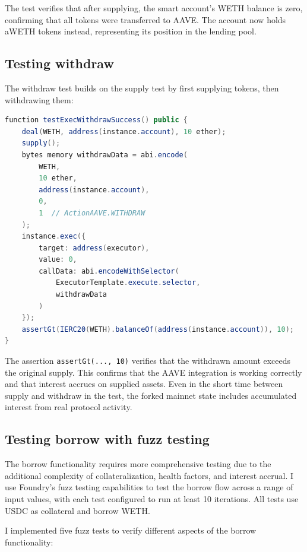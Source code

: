 The test verifies that after supplying, the smart account's WETH balance is zero, confirming that all tokens were transferred to AAVE. The account now holds aWETH tokens instead, representing its position in the lending pool.

\subsection{Testing withdraw}

The withdraw test builds on the supply test by first supplying tokens, then withdrawing them:

\begin{lstlisting}[language=Java,caption={Withdraw test},label=lst:test-withdraw]
function testExecWithdrawSuccess() public {
    deal(WETH, address(instance.account), 10 ether);
    supply();
    bytes memory withdrawData = abi.encode(
        WETH,
        10 ether,
        address(instance.account),
        0,
        1  // ActionAAVE.WITHDRAW
    );
    instance.exec({
        target: address(executor),
        value: 0,
        callData: abi.encodeWithSelector(
            ExecutorTemplate.execute.selector,
            withdrawData
        )
    });
    assertGt(IERC20(WETH).balanceOf(address(instance.account)), 10);
}
\end{lstlisting}

The assertion \texttt{assertGt(..., 10)} verifies that the withdrawn amount exceeds the original supply. This confirms that the AAVE integration is working correctly and that interest accrues on supplied assets. Even in the short time between supply and withdraw in the test, the forked mainnet state includes accumulated interest from real protocol activity.

\subsection{Testing borrow with fuzz testing}

The borrow functionality requires more comprehensive testing due to the additional complexity of collateralization, health factors, and interest accrual. I use Foundry's fuzz testing capabilities to test the borrow flow across a range of input values, with each test configured to run at least 10 iterations. All tests use USDC as collateral and borrow WETH.

I implemented five fuzz tests to verify different aspects of the borrow functionality:


